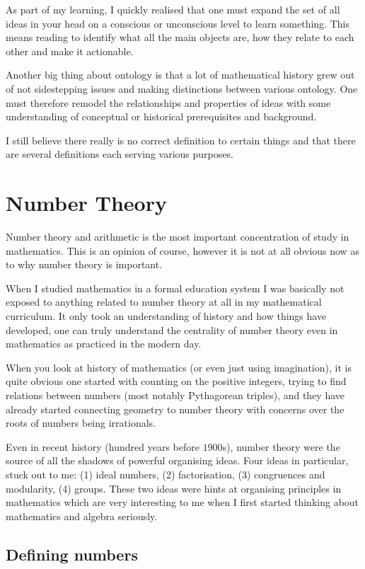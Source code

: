 \documentclass{tufte-book}
\begin{document}
As part of my learning, I quickly realised that one must expand the set of all ideas in your head on a conscious or unconscious level to learn something. This means reading to identify what all the main objects are, how they relate to each other and make it actionable.

Another big thing about ontology is that a lot of mathematical history grew out of not sidestepping issues and making distinctions between various ontology. One must therefore remodel the relationships and properties of ideas with some understanding of conceptual or historical prerequisites and background.

I still believe there really is no correct definition to certain things and that there are several definitions each serving various purposes.

\chapter{Number Theory}

Number theory and arithmetic is the most important concentration of study in mathematics.
This is an opinion of course, however it is not at all obvious now as to why number theory is important.

When I studied mathematics in a formal education system I was basically not exposed to anything related to number theory at all in my mathematical curriculum. It only took an understanding of history and how things have developed, one can truly understand the centrality of number theory even in mathematics as practiced in the modern day.

When you look at history of mathematics (or even just using imagination), it is quite obvious one started with counting on the positive integers, trying to find relations between numbers (most notably Pythagorean triples), and they have already started connecting geometry to number theory with concerns over the roots of numbers being irrationals.

Even in recent history (hundred years before $1900$s), number theory were the source of all the shadows of powerful organising ideas. Four ideas in particular, stuck out to me: (1) ideal numbers, (2) factorisation, (3) congruences and modularity, (4) groups. These two ideas were hints at organising principles in mathematics which are very interesting to me when I first started thinking about mathematics and algebra seriously.

\section{Defining numbers}
\end{document}
